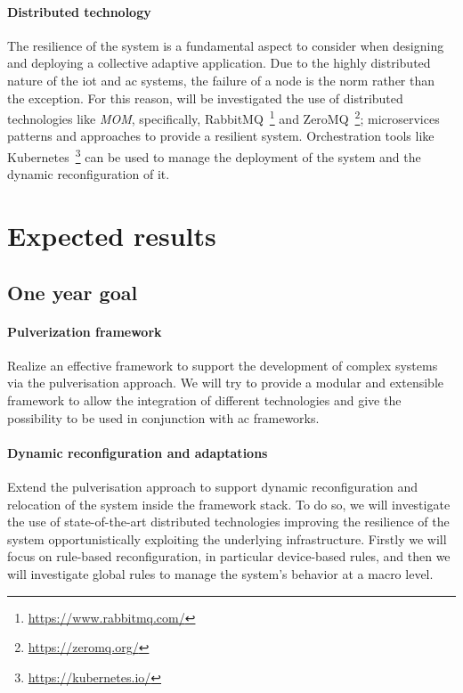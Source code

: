 \documentclass[12pt]{article}
\begin{document}
\paragraph{Distributed technology}
The resilience of the system is a fundamental aspect to consider when designing
and deploying a collective adaptive application.
%
Due to the highly distributed nature of the \ac{iot} and \ac{ac} systems,
the failure of a node is the norm rather than the exception.
%
For this reason, will be investigated the use of distributed technologies like \emph{MOM},
specifically, RabbitMQ~\footnote{\url{https://www.rabbitmq.com/}} and ZeroMQ~\footnote{\url{https://zeromq.org/}};
microservices patterns and approaches to provide a resilient system.
%
Orchestration tools like Kubernetes~\footnote{\url{https://kubernetes.io/}} can be used to manage the deployment of the system
and the dynamic reconfiguration of it.

\section{Expected results}\label{sec:expected-results}

\subsection{One year goal}

\paragraph{Pulverization framework}
Realize an effective framework to support the development of complex systems
via the pulverisation approach.
%
We will try to provide a modular and extensible framework to allow the integration
of different technologies and give the possibility to be used in conjunction with
\ac{ac} frameworks.

\paragraph{Dynamic reconfiguration and adaptations}
Extend the pulverisation approach to support dynamic reconfiguration and relocation
of the system inside the framework stack.
%
To do so,
we will investigate the use of state-of-the-art distributed technologies
improving the resilience of the system opportunistically exploiting
the underlying infrastructure.
%
Firstly we will focus on rule-based reconfiguration,
in particular device-based rules, and then we will investigate
global rules to manage the system's behavior at a macro level.
\end{document}

